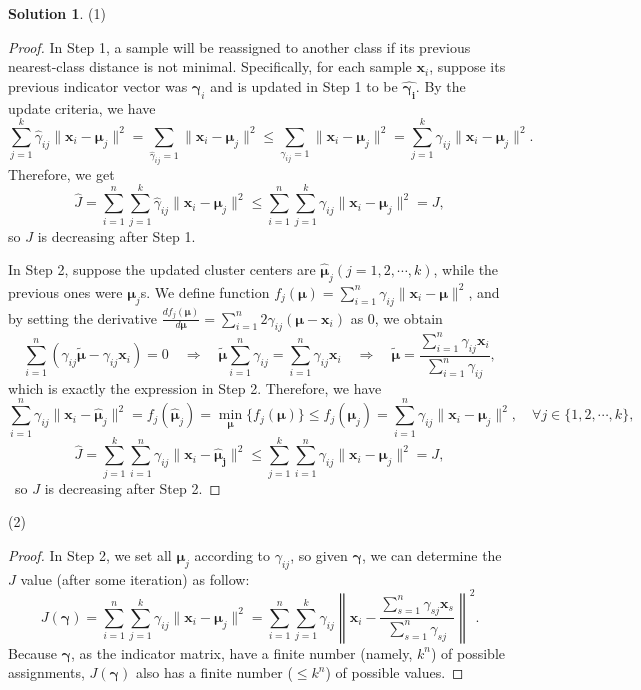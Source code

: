 \documentclass[a4paper,UTF8]{article}
\numberwithin{equation}{section}
\theoremstyle{definition}
\newtheorem*{solution}{Solution}
\begin{document}
\begin{solution}
\item[(1)]
\begin{proof}
In Step 1, a sample will be reassigned to another class if its previous nearest-class distance is not minimal. Specifically, for each sample $\bm{x}_i$, suppose its previous indicator vector was $\bm\gamma_i$ and is updated in Step 1 to be $\bm{\hat{\gamma_i}}$. By the update criteria, we have
\begin{equation}
\sum_{j=1}^k\hat\gamma_{ij}\|\bm{x}_i-\bm\mu_j\|^2=\sum_{\hat\gamma_{ij}=1}\|\bm{x}_i-\bm\mu_{j}\|^2\leq\sum_{\gamma_{ij}=1}\|\bm{x}_i-\bm\mu_j\|^2=\sum_{j=1}^k\gamma_{ij}\|\bm{x}_i-\bm\mu_j\|^2.
\end{equation}
Therefore, we get
\begin{equation}
\hat J=\sum_{i=1}^n \sum_{j=1}^k \hat \gamma_{ij}\|\bm x_i - \bm\mu_j\|^2\leq\sum_{i=1}^n \sum_{j=1}^k\gamma_{ij}\|\bm x_i - \bm\mu_j\|^2=J,
\end{equation}
so $J$ is decreasing after Step 1.

In Step 2, suppose the updated cluster centers are $\bm{\hat\mu}_j(j=1,2,\cdots, k)$, while the previous ones were $\bm\mu_j$s. We define function $f_j(\bm\mu)=\sum_{i=1}^n\gamma_{ij}\|\bm{x}_i-\bm\mu\|^2$, and by setting the derivative $\frac{df_j(\bm\mu)}{d\bm\mu}=\sum_{i=1}^n2\gamma_{ij}(\bm\mu-\bm{x}_i)$ as 0, we obtain
\begin{equation}
\sum_{i=1}^n(\gamma_{ij}\bm{\tilde\mu}-\gamma_{ij}\bm x_i)=0\quad\Rightarrow\quad \bm{\tilde\mu}\sum_{i=1}^n\gamma_{ij}=\sum_{i=1}^n\gamma_{ij}\bm x_i\quad \Rightarrow\quad \bm{\tilde\mu}=\frac{\sum_{i=1}^n\gamma_{ij}\bm x_i}{\sum_{i=1}^n\gamma_{ij}},
\end{equation}
which is exactly the expression in Step 2. Therefore, we have
\begin{equation}
\sum_{i=1}^n\gamma_{ij}\|\bm{x}_i-\bm{\hat\mu}_j\|^2=f_j(\bm{\hat\mu}_j)=\min_{\bm\mu}\{f_j(\bm\mu)\}\leq f_j(\bm\mu_j)=\sum_{i=1}^n\gamma_{ij}\|\bm{x}_i-\bm\mu_j\|^2, \quad \forall j\in\{1,2,\cdots,k\},
\end{equation}
\begin{equation}
\hat J=\sum_{j=1}^k\sum_{i=1}^n  \gamma_{ij}\|\bm x_i - \bm{\hat\mu_j}\|^2 \leq \sum_{j=1}^k\sum_{i=1}^n\gamma_{ij}\|\bm{x}_i-\bm\mu_j\|^2=J,
\end{equation}\
so $J$ is decreasing after Step 2.
\end{proof}

\item[(2)] 
\begin{proof}
In Step 2, we set all $\bm\mu_j$ according to $\gamma_{ij}$, so given $\bm\gamma$, we can determine the $J$ value (after some iteration) as follow:
\begin{equation}
J(\bm\gamma) = \sum_{i=1}^n\sum_{j=1}^k  \gamma_{ij}\|\bm x_i - \bm\mu_j\|^2= \sum_{i=1}^n\sum_{j=1}^k  \gamma_{ij}\left\|\bm x_i - \frac{\sum_{s=1}^n\gamma_{sj}\bm x_s}{\sum_{s=1}^n\gamma_{sj}}\right\|^2.
\end{equation}
Because $\bm\gamma$, as the indicator matrix, have a finite number (namely, $k^n$) of possible assignments, $J(\bm\gamma)$ also has a finite number ($\leq k^n$) of possible values. 


\end{proof}
\end{solution}
\end{document}
